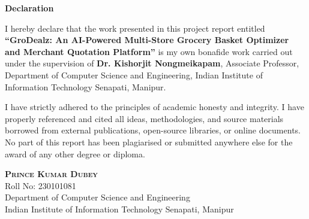 \documentclass[a4paper, 12pt, oneside]{report}
\begin{document}
\begin{center}
    {\LARGE \textbf{Declaration}}
\end{center}
\vspace{1cm}

I hereby declare that the work presented in this project report entitled \textbf{``GroDealz: An AI-Powered Multi-Store Grocery Basket Optimizer and Merchant Quotation Platform''} is my own bonafide work carried out under the supervision of \textbf{Dr. Kishorjit Nongmeikapam}, Associate Professor, Department of Computer Science and Engineering, Indian Institute of Information Technology Senapati, Manipur.

I have strictly adhered to the principles of academic honesty and integrity. I have properly referenced and cited all ideas, methodologies, and source materials borrowed from external publications, open-source libraries, or online documents. No part of this report has been plagiarised or submitted anywhere else for the award of any other degree or diploma.

\vspace{2cm}
\begin{flushright}
{\scshape\large \textbf{Prince Kumar Dubey}}\\[0.35em]
Roll No: 230101081\\[0.25em]
Department of Computer Science and Engineering\\[0.25em]
Indian Institute of Information Technology Senapati, Manipur
\end{flushright}

\newpage
\end{document}
